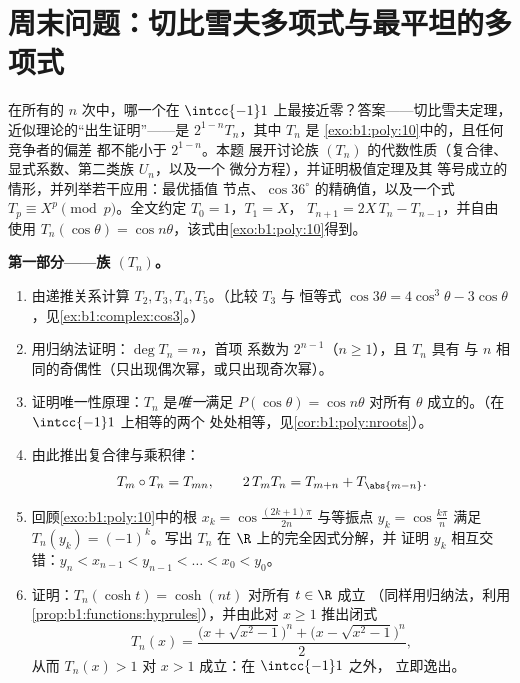 \section{周末问题：切比雪夫多项式与最平坦的多项式}

\begin{problem}\label{pb:b1:poly:1}
在所有\emph{}的 $n$ 次中，哪一个在
$\intcc{-1}1$ 上最接近零？答案——切比雪夫定理，
近似理论的“出生证明”——是
$2^{1-n}T_n$，其中 $T_n$ 是
\cref{exo:b1:poly:10}中的，且任何竞争者的偏差
都不能小于 $2^{1-n}$。本题
展开讨论族 $(T_n)$ 的代数性质（复合律、
显式系数、第二类族 $U_n$，以及一个
微分方程），并证明极值定理及其
等号成立的情形，并列举若干应用：最优插值
节点、$\cos 36^\circ$ 的精确值，以及一个式
$T_p \equiv X^p \pmod p$。全文约定 $T_0 = 1$，$T_1 = X$，
$T_{n+1} = 2X\,T_n - T_{n-1}$，并自由使用
$T_n(\cos\theta) = \cos n\theta$，该式由\cref{exo:b1:poly:10}得到。

\medskip
\noindent\textbf{第一部分——族 $(T_n)$。}
\begin{enumerate}
  \item 由递推关系计算 $T_2, T_3, T_4, T_5$。（比较 $T_3$ 与
        恒等式 $\cos3\theta = 4\cos^3\theta -
        3\cos\theta$，见\cref{ex:b1:complex:cos3}。）
  \item 用归纳法证明：$\deg T_n = n$，首项
        系数为 $2^{n-1}$（$n \geq 1$），且 $T_n$ 具有
        与 $n$ 相同的奇偶性（只出现偶次幂，或只出现奇次幂）。
  \item 证明唯一性原理：$T_n$ 是\emph{唯一}满足
        $P(\cos\theta) = \cos n\theta$ 对所有
        $\theta$ 成立的。（在 $\intcc{-1}1$ 上相等的两个
        处处相等，见\cref{cor:b1:poly:nroots}）。
  \item 由此推出复合律与乘积律：
        \[
        T_m \circ T_n = T_{mn},
        \qquad
        2\,T_m T_n = T_{m+n} + T_{\abs{m-n}} .
        \]
  \item 回顾\cref{exo:b1:poly:10}中的根 $x_k =
        \cos\frac{(2k+1)\pi}{2n}$ 与等振点
        $y_k = \cos\frac{k\pi}n$ 满足 $T_n(y_k) = (-1)^k$。写出
        $T_n$ 在 $\R$ 上的完全因式分解，并
        证明 $y_k$ 相互交错：$y_n < x_{n-1} < y_{n-1}
        < \dots < x_0 < y_0$。
  \item 证明：$T_n(\cosh t) = \cosh(nt)$ 对所有 $t \in \R$ 成立
        （同样用归纳法，利用
        \cref{prop:b1:functions:hyprules}），并由此对 $x
        \geq 1$ 推出闭式
        \[
        T_n(x) = \frac{\bigl(x + \sqrt{x^2 - 1}\bigr)^n +
        \bigl(x - \sqrt{x^2 - 1}\bigr)^n}{2} ,
        \]
        从而 $T_n(x) > 1$ 对 $x > 1$ 成立：在 $\intcc{-1}1$ 之外，
        立即逸出。
\end{enumerate}


\end{problem}
